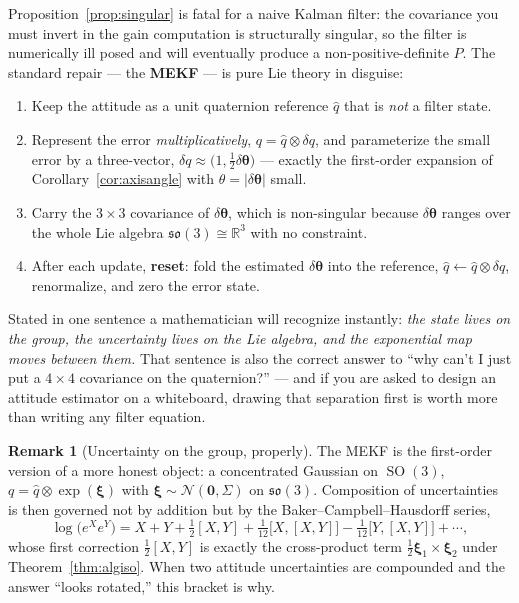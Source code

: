 \documentclass[11pt]{article}
\DeclareMathOperator{\SO}{SO}
\newcommand{\so}{\mathfrak{so}}
\newcommand{\R}{\mathbb{R}}
\newcommand{\vv}[1]{\bm{#1}}
\theoremstyle{plain}
\theoremstyle{definition}
\newtheorem{remark}[theorem]{Remark}
\begin{document}
\begin{practical}
Proposition~\ref{prop:singular} is fatal for a naive Kalman filter: the covariance you must invert
in the gain computation is structurally singular, so the filter is numerically ill posed and will
eventually produce a non-positive-definite $P$. The standard repair --- the \textbf{MEKF} --- is
pure Lie theory in disguise:
\begin{enumerate}[leftmargin=1.4em,topsep=2pt]
\item Keep the attitude as a unit quaternion reference $\hat q$ that is \emph{not} a filter state.
\item Represent the error \emph{multiplicatively}, $q=\hat q\otimes\delta q$, and parameterize the
small error by a three-vector, $\delta q\approx\big(1,\tfrac12\delta\bm\theta\big)$ --- exactly the
first-order expansion of Corollary~\ref{cor:axisangle} with $\theta=|\delta\bm\theta|$ small.
\item Carry the $3\times3$ covariance of $\delta\bm\theta$, which is non-singular because
$\delta\bm\theta$ ranges over the whole Lie algebra $\so(3)\cong\R^3$ with no constraint.
\item After each update, \textbf{reset}: fold the estimated $\delta\bm\theta$ into the reference,
$\hat q\leftarrow\hat q\otimes\delta q$, renormalize, and zero the error state.
\end{enumerate}
Stated in one sentence a mathematician will recognize instantly: \emph{the state lives on the
group, the uncertainty lives on the Lie algebra, and the exponential map moves between them.} That
sentence is also the correct answer to ``why can't I just put a $4\times4$ covariance on the
quaternion?'' --- and if you are asked to design an attitude estimator on a whiteboard, drawing
that separation first is worth more than writing any filter equation.
\end{practical}

\begin{remark}[Uncertainty on the group, properly]
The MEKF is the first-order version of a more honest object: a concentrated Gaussian on $\SO(3)$,
$q=\hat q\otimes\exp(\bm\xi)$ with $\bm\xi\sim\mathcal N(\vv 0,\Sigma)$ on $\so(3)$. Composition of
uncertainties is then governed not by addition but by the Baker--Campbell--Hausdorff series,
\[
\log\big(e^{X}e^{Y}\big)=X+Y+\tfrac12[X,Y]+\tfrac1{12}\big[X,[X,Y]\big]-\tfrac1{12}\big[Y,[X,Y]\big]+\cdots,
\]
whose first correction $\tfrac12[X,Y]$ is exactly the cross-product term
$\tfrac12\bm\xi_1\times\bm\xi_2$ under Theorem~\ref{thm:algiso}. When two attitude uncertainties are
compounded and the answer ``looks rotated,'' this bracket is why.
\end{remark}
\end{document}
